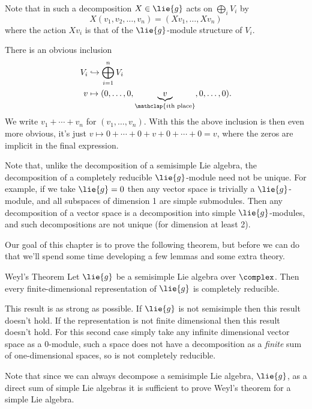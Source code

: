 \documentclass[fleqn]{NotesClass}
\begin{document}
    Note that in such a decomposition \(X \in \lie{g}\) acts on \(\bigoplus_i V_i\) by
    \begin{equation}
        X(v_1, v_2, \dotsc, v_n) = (Xv_1, \dotsc, Xv_n)
    \end{equation}
    where the action \(Xv_i\) is that of the \(\lie{g}\)-module structure of \(V_i\).
    
    There is an obvious inclusion
    \begin{align}
        V_i &\hookrightarrow \bigoplus_{i=1}^n V_i\\
        v &\mapsto (0, \dotsc, 0, \underbrace{v}_{\mathclap{i\text{th place}}}, 0, \dotsc, 0).
    \end{align}
    We write \(v_1 + \dotsb + v_n\) for \((v_1, \dotsc, v_n)\).
    With this the above inclusion is then even more obvious, it's just \(v \mapsto 0 + \dotsb + 0 + v + 0 + \dotsb + 0 = v\), where the zeros are implicit in the final expression.
    
    Note that, unlike the decomposition of a semisimple Lie algebra, the decomposition of a completely reducible \(\lie{g}\)-module need not be unique.
    For example, if we take \(\lie{g} = 0\) then any vector space is trivially a \(\lie{g}\)-module, and all subspaces of dimension 1 are simple submodules.
    Then any decomposition of a vector space is a decomposition into simple \(\lie{g}\)-modules, and such decompositions are not unique (for dimension at least 2).
    
    Our goal of this chapter is to prove the following theorem, but before we can do that we'll spend some time developing a few lemmas and some extra theory.
    
    \begin{thm}{Weyl's Theorem}{}
        Let \(\lie{g}\) be a semisimple Lie algebra over \(\complex\).
        Then every finite-dimensional representation of \(\lie{g}\) is completely reducible.
    \end{thm}
    
    This result is as strong as possible.
    If \(\lie{g}\) is not semisimple then this result doesn't hold.
    If the representation is not finite dimensional then this result doesn't hold.
    For this second case simply take any infinite dimensional vector space as a \(0\)-module, such a space does not have a decomposition as a \emph{finite} sum of one-dimensional spaces, so is not completely reducible.
    
    Note that since we can always decompose a semisimple Lie algebra, \(\lie{g}\), as a direct sum of simple Lie algebras it is sufficient to prove Weyl's theorem for a simple Lie algebra.
    
\end{document}
